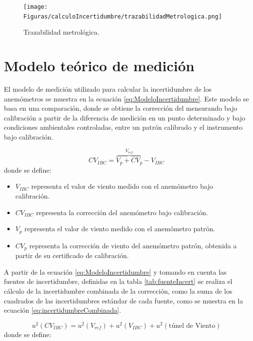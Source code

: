 \begin{figure}[H]
    \centering
    \texttt{[image: Figuras/calculoIncertidumbre/trazabilidadMetrologica.png]}
    \caption{Trazabilidad metrológica. \cite{instrumentosMedicionesFiuba}}
    \label{fig:trazabilidadMetrologica}
\end{figure}


\section{Modelo teórico de medición}\label{sec:modelo_teoricos}

El modelo de medición utilizado para calcular la incertidumbre de los anemómetros se muestra en la ecuación \ref{eq:ModeloIncertidumbre}. Este modelo se basa en una comparación, donde se obtiene la corrección del mensurando bajo calibración a partir de la diferencia de medición en un punto determinado y bajo condiciones ambientales controladas, entre un patrón calibrado y el instrumento bajo calibración.

\begin{equation}
    CV_{IBC} = \overbrace{V_{p} + CV_{p}}^{V_{ref}} - V_{IBC}
    \label{eq:ModeloIncertidumbre}
\end{equation}
donde se define:

\begin{itemize}
    \item $V_{IBC}$ representa el valor de viento medido con el anemómetro bajo calibración.
    \item $CV_{IBC}$ representa la corrección del anemómetro bajo calibración.
    \item $V_{p}$ representa el valor de viento medido con el anemómetro patrón.
    \item $CV_{p}$ representa la corrección de viento del anemómetro patrón, obtenida a partir de su certificado de calibración.
\end{itemize}

A partir de la ecuación \ref{eq:ModeloIncertidumbre} y tomando en cuenta las fuentes de incertidumbre, definidas en la tabla \ref{tab:fuenteIncert} se realiza el cálculo de la incertidumbre combinada de la corrección, como la suma de los cuadrados de las incertidumbres estándar de cada fuente, como se muestra en la ecuación \ref{eq:incertidumbreCombinada}.

\begin{equation}
    u^{2}(CV_{IBC}) = u^{2}(V_{ref})+u^{2}(V_{IBC})+u^{2}(\text{túnel de Viento})
    \label{eq:incertidumbreCombinada}
\end{equation}
donde se define:

